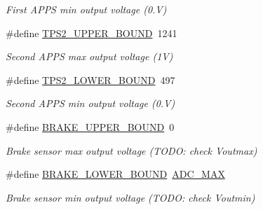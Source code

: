 \begin{DoxyCompactItemize}
\begin{DoxyCompactList}\small\item\em First A\-P\-P\-S min output voltage (0.\-V) \end{DoxyCompactList}\item 
\hypertarget{group___board__model__group_gac8be8d89c699c40b79d04c0fdf6238f4}{\#define \hyperlink{group___board__model__group_gac8be8d89c699c40b79d04c0fdf6238f4}{T\-P\-S2\-\_\-\-U\-P\-P\-E\-R\-\_\-\-B\-O\-U\-N\-D}~1241}\label{group___board__model__group_gac8be8d89c699c40b79d04c0fdf6238f4}

\begin{DoxyCompactList}\small\item\em Second A\-P\-P\-S max output voltage (1\-V) \end{DoxyCompactList}\item 
\hypertarget{group___board__model__group_gadfcc723e175ac44e73e38407299ac875}{\#define \hyperlink{group___board__model__group_gadfcc723e175ac44e73e38407299ac875}{T\-P\-S2\-\_\-\-L\-O\-W\-E\-R\-\_\-\-B\-O\-U\-N\-D}~497}\label{group___board__model__group_gadfcc723e175ac44e73e38407299ac875}

\begin{DoxyCompactList}\small\item\em Second A\-P\-P\-S min output voltage (0.\-V) \end{DoxyCompactList}\item 
\hypertarget{group___board__model__group_ga891de03ab9e1bd9a92ffffe69a1b10ca}{\#define \hyperlink{group___board__model__group_ga891de03ab9e1bd9a92ffffe69a1b10ca}{B\-R\-A\-K\-E\-\_\-\-U\-P\-P\-E\-R\-\_\-\-B\-O\-U\-N\-D}~0}\label{group___board__model__group_ga891de03ab9e1bd9a92ffffe69a1b10ca}

\begin{DoxyCompactList}\small\item\em Brake sensor max output voltage (T\-O\-D\-O\-: check Voutmax) \end{DoxyCompactList}\item 
\hypertarget{group___board__model__group_ga0aed20cafcc206360abda47b125432c7}{\#define \hyperlink{group___board__model__group_ga0aed20cafcc206360abda47b125432c7}{B\-R\-A\-K\-E\-\_\-\-L\-O\-W\-E\-R\-\_\-\-B\-O\-U\-N\-D}~\hyperlink{group___board__model__group_ga555a695bf58df062dc03f0e892d95cd7}{A\-D\-C\-\_\-\-M\-A\-X}}\label{group___board__model__group_ga0aed20cafcc206360abda47b125432c7}

\begin{DoxyCompactList}\small\item\em Brake sensor min output voltage (T\-O\-D\-O\-: check Voutmin) \end{DoxyCompactList}\end{DoxyCompactItemize}
